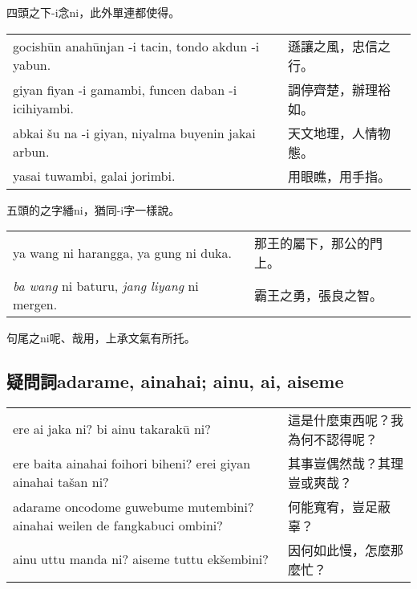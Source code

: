 \documentclass{article}
\begin{document}
\noindent 四頭之下-i念ni，此外單連都使得。
\begin{center}
    \begin{tabularx}{\textwidth}{XX}
     gocish\={u}n anah\={u}njan -i tacin, tondo akdun -i yabun.&遜讓之風，忠信之行。\\
     giyan fiyan -i gamambi, funcen daban -i icihiyambi.&調停齊楚，辦理裕如。\\
     abkai \v{s}u na -i giyan, niyalma buyenin jakai arbun.&天文地理，人情物態。\\
     yasai tuwambi, galai jorimbi.&用眼瞧，用手指。
    \end{tabularx}
\end{center}

\noindent 五頭的之字繙ni，猶同-i字一樣說。
\begin{center}
    \begin{tabularx}{\textwidth}{XX}
     ya wang ni harangga, ya gung ni duka.&那王的屬下，那公的門上。\\
     \emph{ba wang} ni baturu, \emph{jang liyang} ni mergen.&霸王之勇，張良之智。
    \end{tabularx}
\end{center}

\noindent 句尾之ni呢、哉用，上承文氣有所托。

\subsection{疑問詞adarame, ainahai; ainu, ai, aiseme}
\begin{center}
    \begin{tabularx}{\textwidth}{XX}
     ere ai jaka ni? bi ainu takarak\={u} ni?&這是什麼東西呢？我為何不認得呢？\\
     ere baita ainahai foihori biheni? erei giyan ainahai ta\v{s}an ni?&其事豈偶然哉？其理豈或爽哉？\\
     adarame oncodome guwebume mutembini? ainahai weilen de fangkabuci ombini?&何能寬宥，豈足蔽辜？\\
     ainu uttu manda ni? aiseme tuttu ek\v{s}embini?&因何如此慢，怎麼那麼忙？
    \end{tabularx}
\end{center}
\end{document}
